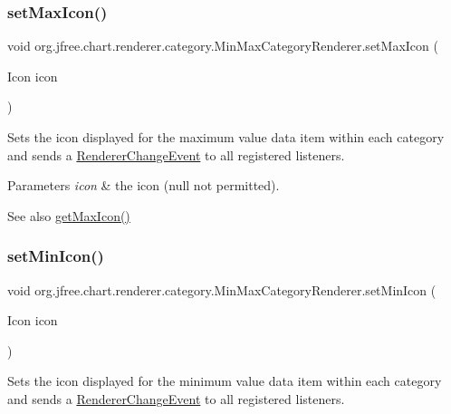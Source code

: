 \subsubsection{\texorpdfstring{set\+Max\+Icon()}{setMaxIcon()}}
{\footnotesize\ttfamily void org.\+jfree.\+chart.\+renderer.\+category.\+Min\+Max\+Category\+Renderer.\+set\+Max\+Icon (\begin{DoxyParamCaption}\item[{Icon}]{icon }\end{DoxyParamCaption})}

Sets the icon displayed for the maximum value data item within each category and sends a \mbox{\hyperlink{}{Renderer\+Change\+Event}} to all registered listeners.


\begin{DoxyParams}{Parameters}
{\em icon} & the icon ({\ttfamily null} not permitted).\\
\hline
\end{DoxyParams}
\begin{DoxySeeAlso}{See also}
\mbox{\hyperlink{classorg_1_1jfree_1_1chart_1_1renderer_1_1category_1_1_min_max_category_renderer_a0c66a866bf528c580abd49ff3b8ba808}{get\+Max\+Icon()}} 
\end{DoxySeeAlso}
\mbox{\label{classorg_1_1jfree_1_1chart_1_1renderer_1_1category_1_1_min_max_category_renderer_ab61a4df28c34c2298623f849a38ef9ee}} 
\subsubsection{\texorpdfstring{set\+Min\+Icon()}{setMinIcon()}}
{\footnotesize\ttfamily void org.\+jfree.\+chart.\+renderer.\+category.\+Min\+Max\+Category\+Renderer.\+set\+Min\+Icon (\begin{DoxyParamCaption}\item[{Icon}]{icon }\end{DoxyParamCaption})}

Sets the icon displayed for the minimum value data item within each category and sends a \mbox{\hyperlink{}{Renderer\+Change\+Event}} to all registered listeners.


